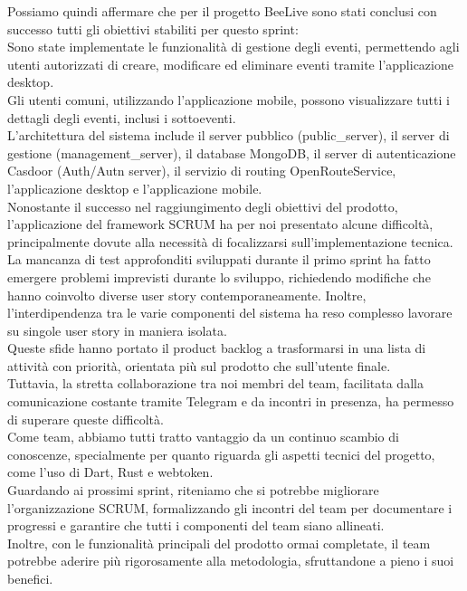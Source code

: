 \documentclass{article}
\begin{document}
Possiamo quindi affermare che per il progetto BeeLive sono stati conclusi con successo tutti gli obiettivi stabiliti per questo sprint:\\
Sono state implementate le funzionalità di gestione degli eventi, permettendo agli utenti autorizzati di creare, modificare ed eliminare eventi tramite l'applicazione desktop.\\
Gli utenti comuni, utilizzando l'applicazione mobile, possono visualizzare tutti i dettagli degli eventi, inclusi i sottoeventi.\\
L'architettura del sistema include il server pubblico (public\_server), il server di gestione (management\_server), il database MongoDB, il server di autenticazione Casdoor (Auth/Autn server), il servizio di routing OpenRouteService, l'applicazione desktop e l'applicazione mobile.\\

Nonostante il successo nel raggiungimento degli obiettivi del prodotto, l'applicazione del framework SCRUM ha per noi presentato alcune difficoltà, principalmente dovute alla necessità di focalizzarsi sull'implementazione tecnica.\\
La mancanza di test approfonditi sviluppati durante il primo sprint ha fatto emergere problemi imprevisti durante lo sviluppo, richiedendo modifiche che hanno coinvolto diverse user story contemporaneamente. Inoltre, l'interdipendenza tra le varie componenti del sistema ha reso complesso lavorare su singole user story in maniera isolata.\\
Queste sfide hanno portato il product backlog a trasformarsi in una lista di attività con priorità, orientata più sul prodotto che sull'utente finale.\\

Tuttavia, la stretta collaborazione tra noi membri del team, facilitata dalla comunicazione costante tramite Telegram e da incontri in presenza, ha permesso di superare queste difficoltà.\\
Come team, abbiamo tutti tratto vantaggio da un continuo scambio di conoscenze, specialmente per quanto riguarda gli aspetti tecnici del progetto, come l'uso di Dart, Rust e webtoken.\\

Guardando ai prossimi sprint, riteniamo che si potrebbe migliorare l'organizzazione SCRUM, formalizzando gli incontri del team per documentare i progressi e garantire che tutti i componenti del team siano allineati.\\
Inoltre, con le funzionalità principali del prodotto ormai completate, il team potrebbe aderire più rigorosamente alla metodologia, sfruttandone a pieno i suoi benefici.\\
\end{document}
